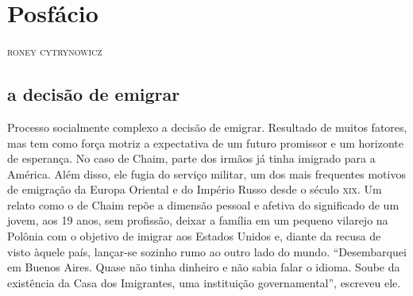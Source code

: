 \chapter*{Posfácio\smallskip{}}

\begin{flushright}
\textsc{roney cytrynowicz}
\end{flushright}\medskip

\noindent{}


\section{a decisão de emigrar}

Processo socialmente complexo a decisão de emigrar. Resultado de muitos fatores, mas tem 
como força motriz a expectativa de um futuro promissor e um horizonte de
esperança. No caso de Chaim, parte dos irmãos já tinha imigrado para a
América. Além disso, ele fugia do serviço militar, um dos mais frequentes
motivos de emigração da Europa Oriental e do Império Russo desde o
século \textsc{xix}. Um relato como o de Chaim repõe a dimensão pessoal e afetiva do
significado de um jovem, aos 19 anos, sem profissão, deixar a família em
um pequeno vilarejo na Polônia com o objetivo de imigrar aos Estados
Unidos e, diante da recusa de visto àquele país, lançar-se sozinho rumo
ao outro lado do mundo. ``Desembarquei em Buenos Aires. Quase não tinha dinheiro e não sabia falar
o idioma. Soube da existência da Casa dos Imigrantes, uma instituição governamental'', escreveu ele.

